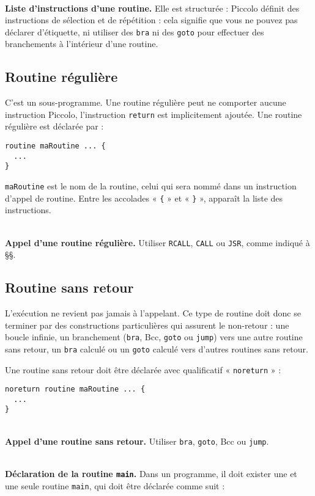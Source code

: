 ~\\
\textbf{Liste d’instructions d’une routine.} Elle est structurée : Piccolo définit des instructions de sélection et de répétition : cela signifie que vous ne pouvez pas déclarer d’étiquette, ni utiliser des \texttt{bra} ni des \texttt{goto} pour effectuer des branchements à l’intérieur d’une routine.


\subsection{Routine régulière}

C'est un sous-programme. Une routine régulière peut ne comporter aucune instruction Piccolo, l'instruction \texttt{return} est implicitement ajoutée. Une routine régulière est déclarée par :
\begin{lstlisting}[language=piccolo]
routine maRoutine ... {
  ...
}
\end{lstlisting}

\texttt{maRoutine} est le nom de la routine, celui qui sera nommé dans un instruction d’appel de routine. Entre les accolades « \texttt{\{} » et « \texttt{\}} », apparaît la liste des instructions.

~\\
\textbf{Appel d’une routine régulière.} Utiliser \texttt{RCALL}, \texttt{CALL} ou \texttt{JSR}, comme indiqué à §§.

\subsection{Routine sans retour}

L’exécution ne revient pas jamais à l’appelant. Ce type de routine doit donc se terminer par des constructions particulières qui assurent le non-retour : une boucle infinie, un branchement (\texttt{bra}, Bcc, \texttt{goto} ou \texttt{jump}) vers une autre routine sans retour, un \texttt{bra} calculé ou un \texttt{goto} calculé vers d’autres routines sans retour.

Une routine sans retour doit être déclarée avec qualificatif « \texttt{noreturn} » :
\begin{lstlisting}[language=piccolo]
noreturn routine maRoutine ... {
  ...
}
\end{lstlisting}

~\\
\textbf{Appel d’une routine sans retour.} Utiliser \texttt{bra}, \texttt{goto}, Bcc ou \texttt{jump}.


~\\
\textbf{Déclaration de la routine \texttt{main}.} Dans un programme, il doit exister une et une seule routine \texttt{main}, qui doit être déclarée comme suit :

